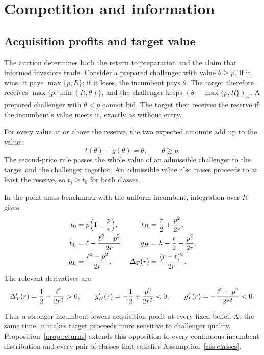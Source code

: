 \section{Competition and information}\label{sec:payoffs}

\subsection{Acquisition profits and target value}\label{sec:profits}

The auction determines both the return to preparation and the claim that informed investors trade. Consider a
prepared challenger with value \(\theta\ge p\). If it wins, it pays \(\max\{p,R\}\); if it loses, the
incumbent pays \(\theta\). The target therefore receives \(\max\{p,\min(R,\theta)\}\), and the challenger
keeps \((\theta-\max\{p,R\})_+\). A prepared challenger with \(\theta<p\) cannot bid. The target then receives
the reserve if the incumbent's value meets it, exactly as without entry.

For every value at or above the reserve, the two expected amounts add up to the value:
\[
t(\theta)+g(\theta)=\theta,\qquad \theta\ge p.
\]
The second-price rule passes the whole value of an admissible challenger to the target and the challenger
together. An admissible value also raises proceeds to at least the reserve, so \(t_j\ge t_0\) for both
classes.

In the point-mass benchmark with the uniform incumbent, integration over \(R\) gives
\begin{equation}\label{eq:payoffs}
\begin{aligned}
t_0&=p\Bigl(1-\frac pr\Bigr),&
t_H&=\frac r2+\frac{p^2}{2r},\\
t_L&=\ell-\frac{\ell^2-p^2}{2r},&
g_H&=h-\frac r2-\frac{p^2}{2r},\\
g_L&=\frac{\ell^2-p^2}{2r},&
\Delta_T(r)&=\frac{(r-\ell)^2}{2r}.
\end{aligned}
\end{equation}
The relevant derivatives are
\begin{equation}\label{eq:derivatives}
\Delta_T'(r)=\frac12-\frac{\ell^2}{2r^2}>0,\qquad
g_H'(r)=-\frac12+\frac{p^2}{2r^2}<0,\qquad
g_L'(r)=-\frac{\ell^2-p^2}{2r^2}<0.
\end{equation}

Thus a stronger incumbent lowers acquisition profit at every fixed belief. At the same time, it makes target
proceeds more sensitive to challenger quality. Proposition~\ref{prop:returns} extends this opposition to every
continuous incumbent distribution and every pair of classes that satisfies Assumption~\ref{ass:classes}.

